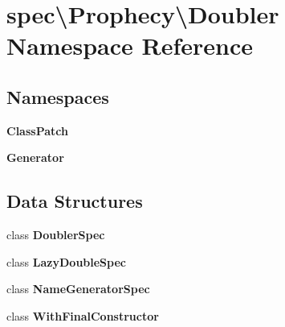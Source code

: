\section{spec\textbackslash{}Prophecy\textbackslash{}Doubler Namespace Reference}
\label{namespacespec_1_1_prophecy_1_1_doubler}
\subsection*{Namespaces}
\begin{DoxyCompactItemize}
\item 
 {\bf Class\+Patch}
\item 
 {\bf Generator}
\end{DoxyCompactItemize}
\subsection*{Data Structures}
\begin{DoxyCompactItemize}
\item 
class {\bf Doubler\+Spec}
\item 
class {\bf Lazy\+Double\+Spec}
\item 
class {\bf Name\+Generator\+Spec}
\item 
class {\bf With\+Final\+Constructor}
\end{DoxyCompactItemize}
